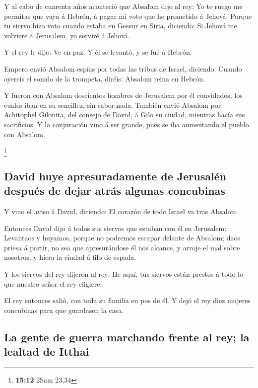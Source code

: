  Y al cabo de cuarenta años aconteció que Absalom dijo al
rey: Yo te ruego me permitas que vaya á Hebrón, á pagar mi voto que he
prometido á Jehová:  Porque tu siervo hizo voto cuando
estaba en Gessur en Siria, diciendo: Si Jehová me volviere á Jerusalem,
yo serviré á Jehová.

 Y el rey le dijo: Ve en paz. Y él se levantó, y se fué á
Hebrón.

 Empero envió Absalom espías por todas las tribus de
Israel, diciendo: Cuando oyereis el sonido de la trompeta, diréis:
Absalom reina en Hebrón.

 Y fueron con Absalom doscientos hombres de Jerusalem por
él convidados, los cuales iban en su sencillez, sin saber nada.
 También envió Absalom por Achitophel Gilonita, del consejo
de David, á Gilo su ciudad, mientras hacía sus sacrificios. Y la
conjuración vino á ser grande, pues se iba aumentando el pueblo con
Absalom.

\footnote{\textbf{15:12} 2Sam 23,34}

\hypertarget{david-huye-apresuradamente-de-jerusaluxe9n-despuuxe9s-de-dejar-atruxe1s-algunas-concubinas}{%
\subsection{David huye apresuradamente de Jerusalén después de dejar
atrás algunas
concubinas}\label{david-huye-apresuradamente-de-jerusaluxe9n-despuuxe9s-de-dejar-atruxe1s-algunas-concubinas}}

 Y vino el aviso á David, diciendo: El corazón de todo
Israel va tras Absalom.

 Entonces David dijo á todos sus siervos que estaban con él
en Jerusalem: Levantaos y huyamos, porque no podremos escapar delante de
Absalom; daos priesa á partir, no sea que apresurándose él nos alcance,
y arroje el mal sobre nosotros, y hiera la ciudad á filo de espada.

 Y los siervos del rey dijeron al rey: He aquí, tus siervos
están prestos á todo lo que nuestro señor el rey eligiere.

 El rey entonces salió, con toda su familia en pos de él. Y
dejó el rey diez mujeres concubinas para que guardasen la casa.

\hypertarget{la-gente-de-guerra-marchando-frente-al-rey-la-lealtad-de-itthai}{%
\subsection{La gente de guerra marchando frente al rey; la lealtad de
Itthai}\label{la-gente-de-guerra-marchando-frente-al-rey-la-lealtad-de-itthai}}

